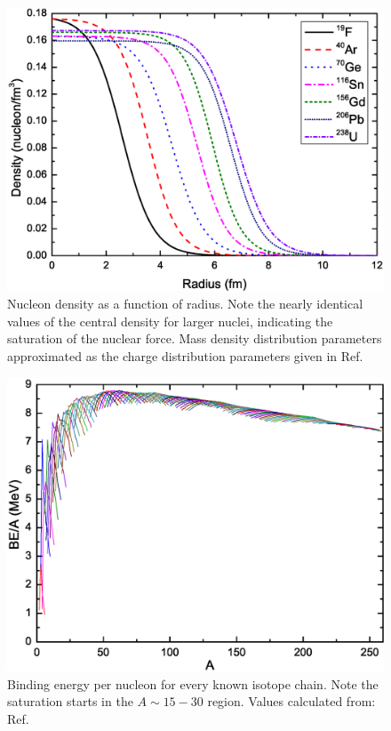 \begin{figure}[h!]
\centerline{\includegraphics[height=0.3\textheight]{./img/c2/density_plot.eps}}
	\caption{Nucleon density as a function of radius. Note the nearly identical values of the central density for larger nuclei, indicating the saturation of the nuclear force. Mass density distribution parameters approximated as the charge distribution parameters given in Ref. \cite{chargeRadii}\label{fig:chp2-density}}
\end{figure}

\begin{figure}[h!]
\centerline{\includegraphics[height=0.3\textheight]{./img/c2/binding_plot.eps}}
	\caption{Binding energy per nucleon for every known isotope chain. Note the saturation starts in the $A\sim15-30$ region. Values calculated from: Ref. \cite{AME20031,AME20032}\label{fig:chp2-bpa}}
\end{figure}

